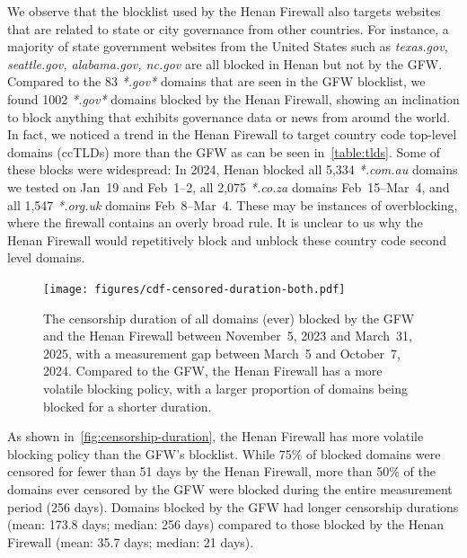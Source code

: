 \documentclass[conference,compsoc]{IEEEtran}
\begin{document}
We observe that the blocklist used by
the Henan Firewall also targets websites that are related to state or city
governance from other countries. For instance, a majority of state government
websites from the United States such as \textit{texas.gov, seattle.gov,
alabama.gov, nc.gov} are all blocked in Henan but not by the GFW. Compared to
the 83 \textit{*.gov*} domains that are seen in the GFW blocklist, we found 1002
\textit{*.gov*} domains blocked by the Henan Firewall,
showing an inclination to block anything that exhibits governance data or news from around the world. In
fact, we noticed a trend in the Henan Firewall to target country code top-level
domains (ccTLDs) more than the GFW as can be seen in~\autoref{table:tlds}.
Some of these blocks were widespread:
In 2024,
Henan blocked all 5,334 \textit{*.com.au}
domains we tested on Jan~19 and Feb~1--2,
all 2,075 \textit{*.co.za} domains
Feb~15--Mar~4,
and all 1,547 \textit{*.org.uk} domains Feb~8--Mar~4.
These may be instances of overblocking,
where the firewall contains an overly broad rule.
It is unclear to us why the Henan Firewall would repetitively block and unblock
these country code second level domains.



%
\begin{figure}[t]
  \centering
  \texttt{[image: figures/cdf-censored-duration-both.pdf]}
  \caption{
    The censorship duration of all domains (ever) blocked by the GFW
    and the Henan Firewall between November~5, 2023 and March~31, 2025,
    with a measurement gap between March~5 and October~7, 2024.
    Compared to the GFW,
    the Henan Firewall has a more volatile blocking policy,
    with a larger proportion of domains being blocked for a shorter duration.
  }
  \label{fig:censorship-duration}
\end{figure}
%
As shown in~\autoref{fig:censorship-duration},
the Henan Firewall has more volatile blocking policy than the GFW's blocklist.
While 75\% of blocked domains were censored for fewer than 51 days by the Henan Firewall,
more than 50\% of the domains ever censored by the GFW were blocked during the entire measurement period (256 days).
Domains blocked by the GFW had longer censorship durations (mean: 173.8 days; median: 256 days)
compared to those blocked by the Henan Firewall (mean: 35.7 days; median: 21 days).
\end{document}

